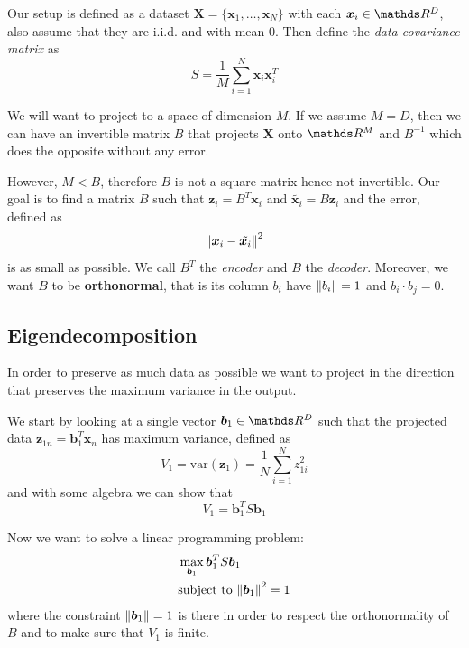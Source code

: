 \documentclass[12pt]{extarticle}
\renewcommand{\vec}[1]{\bm{#1}}
\begin{document}
Our setup is defined as a dataset $\vec X = \{ \vec x_1, \dots, \vec x_N\}$
with each $\vec x_i \in \R^D$, also assume that they are i.i.d. and with mean $0$.
Then define the \emph{data covariance matrix} as
\begin{equation}
	S = \frac{1}{M} \sum_{i = 1}^N \vec x_i \vec x_i^T
\end{equation}

We will want to project to a space of dimension $M$. If we assume $M = D$, then we can have
an invertible matrix $B$ that projects $\bm X$ onto $\R^M$ and $B^{-1}$ which does the opposite
without any error.

However, $M < B$, therefore $B$ is not a square matrix hence not invertible.
Our goal is to find a matrix $B$ such that $\vec z_i = B^T \vec x_i$ and
$\tilde{\vec x_i} = B \vec z_i$ and the error, defined as
\begin{equation}
	\norm{\vec x_i - \tilde{\vec x_i}}^2
\end{equation}
is as small as possible.
We call $B^T$ the \emph{encoder} and $B$ the \emph{decoder}.
Moreover, we want $B$ to be \textbf{orthonormal},
that is its column $b_i$ have $\norm{b_i} = 1$ and $b_i \cdot b_j = 0$.

\subsection{Eigendecomposition}

In order to preserve as much data as possible we want to project in the direction that preserves
the maximum variance in the output.

We start by looking at a single vector $\vec b_1 \in \R^D$ such that the projected data
$\vec z_{1n} = \vec b_1^T \vec x_n$ has maximum variance, defined as
\begin{equation}
	V_1 = \mathrm{var} (\vec z_1) = \frac{1}{N} \sum^N_{i = 1} z_{1i}^2
\end{equation}
and with some algebra we can show that
\begin{equation}
	V_1 = \vec b_1^T S \vec b_1
\end{equation}

Now we want to solve a linear programming problem:
\begin{align}
	 & \max_{\vec b_1} \vec b_1^T S \vec b_1    \\
	 & \text{subject to } \norm{\vec b_1}^2 = 1
\end{align}
where the constraint $\norm{\vec b_1} = 1$ is there in order to respect the orthonormality of $B$
and to make sure that $V_1$ is finite.
\end{document}
